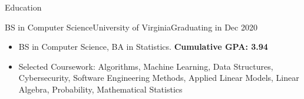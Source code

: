 \documentclass[]{mcdowellcv}
\begin{document}
\makeheader


\begin{cvsection}{Education}
    \begin{cvsubsection}{BS in Computer Science}{University of Virginia}{Graduating in Dec 2020}
        \begin{itemize}
            \item BS in Computer Science, BA in Statistics. \textbf{Cumulative GPA: 3.94}
            \item Selected Coursework: Algorithms, Machine Learning, Data Structures, Cybersecurity, Software Engineering Methods, Applied Linear Models, Linear Algebra, Probability, Mathematical Statistics
        \end{itemize}
    \end{cvsubsection}
\end{cvsection}
\end{document}
